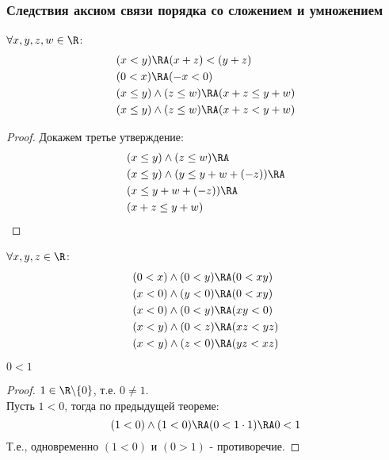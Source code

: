 \documentclass[a4paper, 14pt]{article}
\begin{document}
    \subsubsection*{Следствия аксиом связи порядка со сложением и умножением}

    \begin{theorem}
        $\forall x,y,z,w \in \R$:
        \begin{align*}
            &(x<y) \RA (x + z) < (y + z) \\
            &(0<x) \RA (-x < 0) \\
            &(x \leq y) \land (z \leq w) \RA (x + z \leq y + w) \\
            &(x \leq y) \land (z \leq w) \RA (x + z < y + w) 
        \end{align*}
    \end{theorem}
    \begin{proof}
        Докажем третье утверждение:
        \begin{align*}
            &(x \leq y) \land (z \leq w) \RA \\
            &(x \leq y) \land (y \leq y + w + (-z)) \RA \\
            &(x \leq y + w + (-z)) \RA \\
            &(x + z \leq y + w)
        \end{align*}
    \end{proof}

    \begin{theorem}
        $\forall x,y,z \in \R$:
        \begin{align*}
            &(0 < x) \land (0 < y) \RA (0 < xy) \\
            &(x < 0) \land (y < 0) \RA (0 < xy) \\
            &(x < 0) \land (0 < y) \RA (xy < 0) \\
            &(x < y) \land (0 < z) \RA (xz < yz) \\
            &(x < y) \land (z < 0) \RA (yz < xz)
        \end{align*}
    \end{theorem}

    \begin{theorem}
        $0 < 1$
    \end{theorem}
    \begin{proof}
        $1 \in \R\backslash\{0\}$, т.е. $0 \neq 1$. \\
        Пусть $1 < 0$, тогда по предыдущей теореме:
        \[(1 < 0) \land (1 < 0) \RA (0 < 1 \cdot 1) \RA 0 < 1\]
        Т.е., одновременно $(1 < 0)$ и $(0 > 1)$ - противоречие.
    \end{proof}
\end{document}
